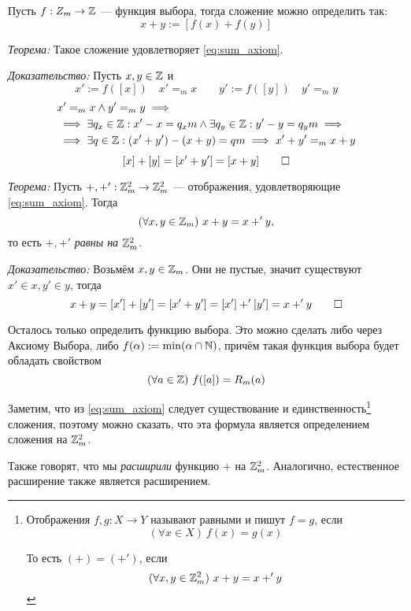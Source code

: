Пусть $f:Z_{m}\to \mathbb Z$ --- функция выбора, тогда сложение можно
определить так:
\[
	x+y:=[f(x)+f(y)]
\]

\vspace{1em}
{\it Теорема:}
Такое сложение удовлетворяет \eqref{eq:sum_axiom}.

{\it Доказательство:}
Пусть $x,y\in \mathbb Z$ и
\[
	x':=f([x])\quad x'=_{m}x\qquad y':=f([y])\quad y'=_{m}y
\]
\[
	\begin{aligned}
		 & x'=_{m}x\land y'=_{m}y\implies                                 \\
		 & \implies \exists q_{x}\in\mathbb Z:x'-x=q_{x}m\land
		\exists q_{y}\in\mathbb Z:y'-y=q_{y}m\implies                            \\
		 & \implies \exists q\in\mathbb Z:(x'+y')-(x+y)=qm\implies x'+y'=_{m}x+y
	\end{aligned}
\]
\[
	[x]+[y]=[x'+y']=[x+y]\qed
\]

\vspace{1em}
{\it Теорема:} Пусть $+,+':\mathbb Z_{m}^{2}\to\mathbb Z_{m}^{2}$ --- отображения,
удовлетворяющие \eqref{eq:sum_axiom}. Тогда
\[
	(\forall x,y\in\mathbb Z_{m})~x+y=x+'y,
\]
то есть $+,+'$ {\it равны на} $\mathbb Z_{m}^{2}$.

{\it Доказательство:} Возьмём $x,y\in\mathbb Z_{m}$. Они не пустые, значит
существуют $x'\in x,y'\in y$, тогда
\[
	x+y=[x']+[y']=[x'+y']=[x']+'[y']=x+'y\qed
\]

Осталось только определить функцию выбора. Это можно сделать либо через
Аксиому Выбора, либо $f(\alpha):=\min(\alpha\cap\mathbb N)$, причём такая функция
выбора будет обладать свойством
\[
	(\forall a\in\mathbb Z)~f([a])=R_{m}(a)
\]

Заметим, что из \eqref{eq:sum_axiom} следует существование и единственность\footnote{
	Отображения $f,g:X\to Y$ называют равными и пишут $f=g$, если
	\[
		(\forall x\in X)~f(x)=g(x)
	\]

	То есть $(+)=(+')$, если
	\[
		(\forall x,y\in \mathbb Z_{m}^{2})~x+y=x+'y
	\]}
сложения, поэтому можно сказать, что эта формула является определением
сложения на $\mathbb Z_{m}^{2}$.

Также говорят, что мы {\it расширили} функцию $+$
на $\mathbb Z_{m}^{2}$. Аналогично, естественное расширение также является расширением.

